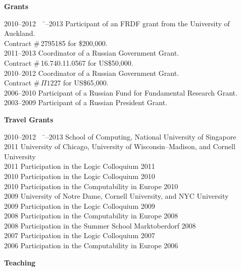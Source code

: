 \documentclass[12pt]{article}
\begin{document}
\centerline{\bf Grants}

\begin{tabbing}
2010--2012 \ \ \= --2013       \> Participant of an FRDF grant from the University of Auckland.\\
		\> Contract \#\,2795185 for \$200,000.\\
2011--2013       \> Coordinator of a Russian Government Grant.\\
		 \> Contract \#\,16.740.11.0567 for US\$50,000.\\
2010--2012       \> Coordinator of a Russian Government Grant.\\
		 \> Contract \#\,$\Pi1227$ for US\$65,000.\\ 
2006--2010       \> Participant of a Russian Fund for Fundamental Research Grant.\\
2003--2009      \> Participant of a Russian President Grant.\\
\end{tabbing}

\centerline{\bf Travel Grants}
\begin{tabbing}
2010--2012 \ \ \= --2013        \> School of Computing, National University of Singapore\\
2011                  \> University of Chicago, University of Wisconsin--Madison, and Cornell University\\
2011                  \> Participation in the Logic Colloquium 2011\\
2010                  \> Participation in the Logic Colloquium 2010\\
2010                  \> Participation in the Computability in Europe 2010\\
2009                  \> University of Notre Dame, Cornell University, and NYC University\\
2009                  \> Participation in the Logic Colloquium 2009\\
2008                  \> Participation in the Computability in Europe 2008\\
2008                  \> Participation in the Summer School Marktoberdorf 2008\\
2007                  \> Participation in the Logic Colloquium 2007\\
2006                  \> Participation in the Computability in Europe 2006\\
\end{tabbing}

\centerline{\bf Teaching}
\end{document}

